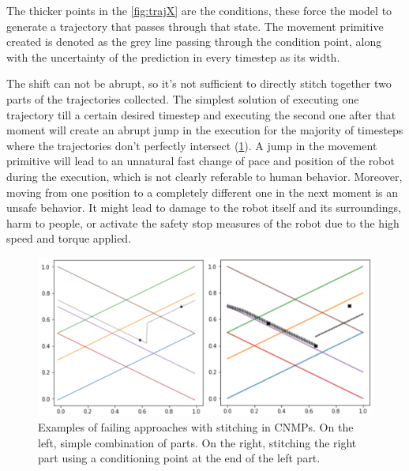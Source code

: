 The thicker points in the \cref{fig:trajX} are the conditions, these force the model to generate a trajectory that passes through that state. The movement primitive created is denoted as the grey line passing through the condition point, along with the uncertainty of the prediction in every timestep as its width. 

The shift can not be abrupt, so it's not sufficient to directly stitch together two parts of the trajectories collected. 
The simplest solution of executing one trajectory till a certain desired timestep and executing the second one after that moment will create an abrupt jump in the execution for the majority of timesteps where the trajectories don't perfectly intersect (\cref{fig:trajX-failing-approaches}). A jump in the movement primitive will lead to an unnatural fast change of pace and position of the robot during the execution, which is not clearly referable to human behavior. Moreover, moving from one position to a completely different one in the next moment is an unsafe behavior. It might lead to damage to the robot itself and its surroundings, harm to people, or activate the safety stop measures of the robot due to the high speed and torque applied.  

\begin{figure}
    \centering
    \includegraphics[width=0.8\linewidth]{figures/trajX-failing-approaches.png}
    \caption{Examples of failing approaches with stitching in CNMPs. On the left, simple combination of parts. On the right, stitching the right part using a conditioning point at the end of the left part.}
    \label{fig:trajX-failing-approaches}
\end{figure}

